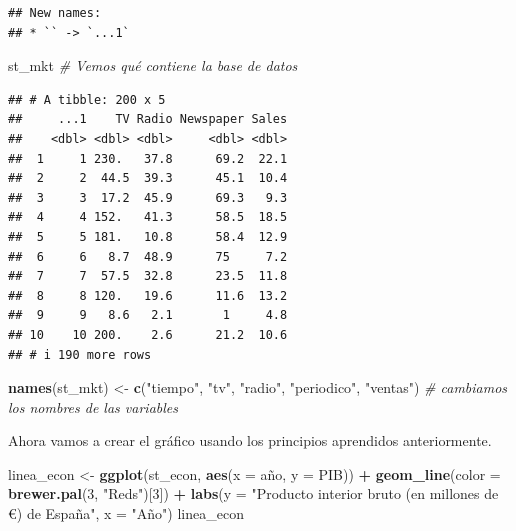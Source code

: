 \documentclass[
]{book}
\newenvironment{Shaded}{\begin{snugshade}}{\end{snugshade}}
\newcommand{\AttributeTok}[1]{\textcolor[rgb]{0.13,0.29,0.53}{#1}}
\newcommand{\CommentTok}[1]{\textcolor[rgb]{0.56,0.35,0.01}{\textit{#1}}}
\newcommand{\DecValTok}[1]{\textcolor[rgb]{0.00,0.00,0.81}{#1}}
\newcommand{\FunctionTok}[1]{\textcolor[rgb]{0.13,0.29,0.53}{\textbf{#1}}}
\newcommand{\NormalTok}[1]{#1}
\newcommand{\OtherTok}[1]{\textcolor[rgb]{0.56,0.35,0.01}{#1}}
\newcommand{\SpecialCharTok}[1]{\textcolor[rgb]{0.81,0.36,0.00}{\textbf{#1}}}
\newcommand{\StringTok}[1]{\textcolor[rgb]{0.31,0.60,0.02}{#1}}
\begin{document}
\begin{verbatim}
## New names:
## * `` -> `...1`
\end{verbatim}

\begin{Shaded}
\begin{Highlighting}[]
\NormalTok{st\_mkt }\CommentTok{\# Vemos qué contiene la base de datos}
\end{Highlighting}
\end{Shaded}

\begin{verbatim}
## # A tibble: 200 x 5
##     ...1    TV Radio Newspaper Sales
##    <dbl> <dbl> <dbl>     <dbl> <dbl>
##  1     1 230.   37.8      69.2  22.1
##  2     2  44.5  39.3      45.1  10.4
##  3     3  17.2  45.9      69.3   9.3
##  4     4 152.   41.3      58.5  18.5
##  5     5 181.   10.8      58.4  12.9
##  6     6   8.7  48.9      75     7.2
##  7     7  57.5  32.8      23.5  11.8
##  8     8 120.   19.6      11.6  13.2
##  9     9   8.6   2.1       1     4.8
## 10    10 200.    2.6      21.2  10.6
## # i 190 more rows
\end{verbatim}

\begin{Shaded}
\begin{Highlighting}[]
\FunctionTok{names}\NormalTok{(st\_mkt) }\OtherTok{\textless{}{-}} \FunctionTok{c}\NormalTok{(}\StringTok{"tiempo"}\NormalTok{, }\StringTok{"tv"}\NormalTok{, }\StringTok{"radio"}\NormalTok{, }\StringTok{"periodico"}\NormalTok{, }\StringTok{"ventas"}\NormalTok{) }\CommentTok{\# cambiamos los nombres de las variables}
\end{Highlighting}
\end{Shaded}

Ahora vamos a crear el gráfico usando los principios aprendidos anteriormente.

\begin{Shaded}
\begin{Highlighting}[]
\NormalTok{linea\_econ }\OtherTok{\textless{}{-}} \FunctionTok{ggplot}\NormalTok{(st\_econ, }\FunctionTok{aes}\NormalTok{(}\AttributeTok{x =}\NormalTok{ año, }\AttributeTok{y =}\NormalTok{ PIB)) }\SpecialCharTok{+}
  \FunctionTok{geom\_line}\NormalTok{(}\AttributeTok{color =} \FunctionTok{brewer.pal}\NormalTok{(}\DecValTok{3}\NormalTok{, }\StringTok{"Reds"}\NormalTok{)[}\DecValTok{3}\NormalTok{]) }\SpecialCharTok{+}
  \FunctionTok{labs}\NormalTok{(}\AttributeTok{y =} \StringTok{"Producto interior bruto (en millones de €) de España"}\NormalTok{, }\AttributeTok{x =} \StringTok{"Año"}\NormalTok{)}
\NormalTok{linea\_econ}
\end{Highlighting}
\end{Shaded}
\end{document}
